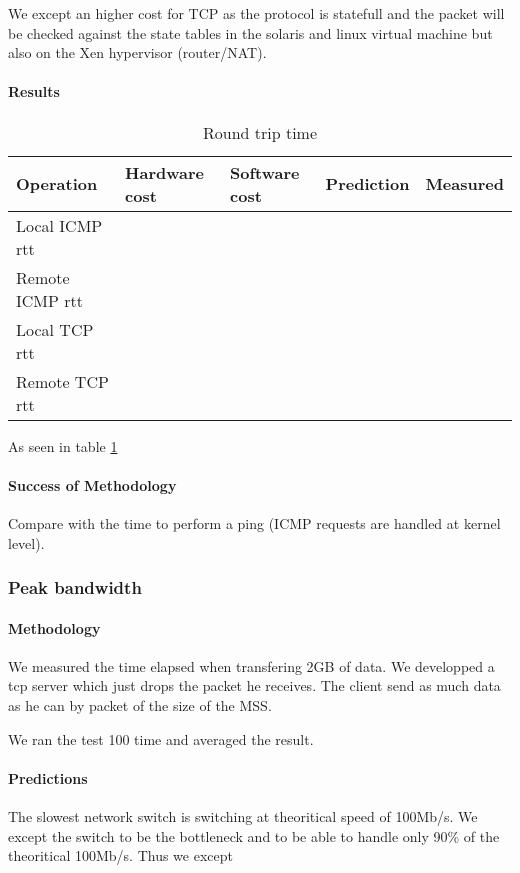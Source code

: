 We except an higher cost for TCP as the protocol is statefull and the packet
will be checked against the state tables in the solaris and linux virtual
machine but also on the Xen hypervisor (router/NAT). 

\paragraph{Results}
\begin{table}[h]
\begin{center}
\begin{tabular}{| l | l | l | l | l |}
\hline
Operation 			& Hardware cost 	& Software cost 		& Prediction 		& Measured \\
\hline
Local ICMP rtt		&				&					&				& 		\\
\hline
Remote ICMP rtt		&				&					&				& 		\\
\hline
Local TCP rtt		&				&					&				& 		\\
\hline
Remote TCP rtt		&				&					&				& 		\\
\hline


\end{tabular}
\end{center}
\caption{Round trip time\label{tab:rtt}}
\end{table}

As seen in table \ref{tab:rtt}
\paragraph{Success of Methodology}

 Compare with the time to perform a ping (ICMP requests are handled at kernel level).






\subsubsection{Peak bandwidth}
\paragraph{Methodology}
We measured the time elapsed when transfering 2GB of data.
We developped a tcp server which just drops the packet he receives.
The client send as much data as he can by packet of the size of the MSS.

We ran the test 100 time and averaged the result.

\paragraph{Predictions}
The slowest network switch is switching at theoritical speed of 100Mb/s.
We except the switch to be the bottleneck and to be able to handle only 90\% of
the theoritical 100Mb/s.
Thus we except

